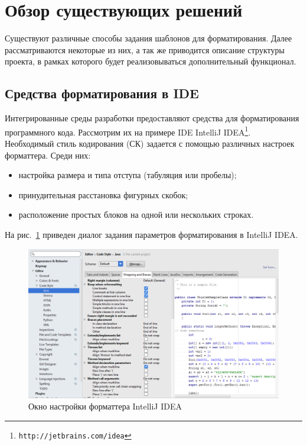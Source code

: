 \section{Обзор существующих решений}
Существуют различные способы задания шаблонов для форматирования. Далее рассматриваются некоторые из них, а так же приводится описание структуры проекта, в рамках которого будет реализовываться дополнительный функционал.

\subsection{Средства форматирования в IDE}
Интегрированные среды разработки предоставляют средства для форматирования программного кода. Рассмотрим их на примере IDE IntelliJ IDEA\footnote{\texttt{http://jetbrains.com/idea}}. Необходимый стиль кодирования (СК) задается с помощью различных настроек форматтера. Среди них:
\begin{itemize}
  \item настройка размера и типа отступа (табуляция или пробелы);
  \item принудительная расстановка фигурных скобок;
  \item расположение простых блоков на одной или нескольких строках.
\end{itemize}

На рис.~\ref{fig:intellijSettings} приведен диалог задания параметров форматирования в IntelliJ IDEA.

\begin{figure}[h!]
	\centering
	\includegraphics[width=\textwidth]{Ozernykh/images/intellijSettings}
	\caption{Окно настройки форматтера IntelliJ IDEA}
	\label{fig:intellijSettings}
\end{figure}


